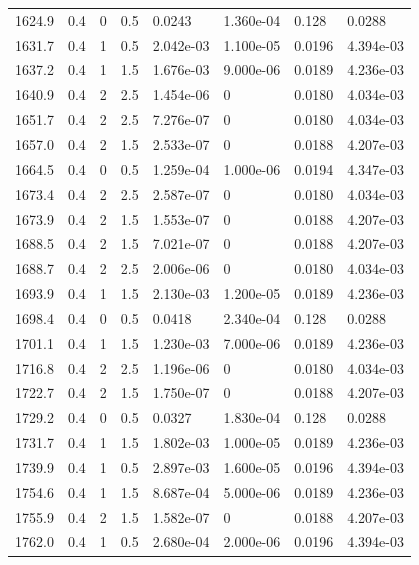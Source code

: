 \documentclass[preview]{standalone}
\begin{document}
{{{{{\begin{tabular}{L{1.2cm}C{1.2cm} C{0.3cm}C{0.5cm} C{1.4cm}C{1.4cm} C{1.4cm}C{1.4cm}}
  1624.9  &   0.4  & 0     & 0.5 &  0.0243  & 1.360e-04  & 0.128 &  0.0288   \\ 
  1631.7  &   0.4  & 1     & 0.5 &  2.042e-03  & 1.100e-05  & 0.0196 &  4.394e-03   \\ 
  1637.2  &   0.4  & 1     & 1.5 &  1.676e-03  & 9.000e-06  & 0.0189 &  4.236e-03   \\ 
  1640.9  &   0.4  & 2     & 2.5 &  1.454e-06  & 0  & 0.0180 &  4.034e-03   \\ 
  1651.7  &   0.4  & 2     & 2.5 &  7.276e-07  & 0  & 0.0180 &  4.034e-03   \\ 
  1657.0  &   0.4  & 2     & 1.5 &  2.533e-07  & 0  & 0.0188 &  4.207e-03   \\ 
  1664.5  &   0.4  & 0     & 0.5 &  1.259e-04  & 1.000e-06  & 0.0194 &  4.347e-03   \\ 
  1673.4  &   0.4  & 2     & 2.5 &  2.587e-07  & 0  & 0.0180 &  4.034e-03   \\ 
  1673.9  &   0.4  & 2     & 1.5 &  1.553e-07  & 0  & 0.0188 &  4.207e-03   \\ 
  1688.5  &   0.4  & 2     & 1.5 &  7.021e-07  & 0  & 0.0188 &  4.207e-03   \\ 
  1688.7  &   0.4  & 2     & 2.5 &  2.006e-06  & 0  & 0.0180 &  4.034e-03   \\ 
  1693.9  &   0.4  & 1     & 1.5 &  2.130e-03  & 1.200e-05  & 0.0189 &  4.236e-03   \\ 
  1698.4  &   0.4  & 0     & 0.5 &  0.0418  & 2.340e-04  & 0.128 &  0.0288   \\ 
  1701.1  &   0.4  & 1     & 1.5 &  1.230e-03  & 7.000e-06  & 0.0189 &  4.236e-03   \\ 
  1716.8  &   0.4  & 2     & 2.5 &  1.196e-06  & 0  & 0.0180 &  4.034e-03   \\ 
  1722.7  &   0.4  & 2     & 1.5 &  1.750e-07  & 0  & 0.0188 &  4.207e-03   \\ 
  1729.2  &   0.4  & 0     & 0.5 &  0.0327  & 1.830e-04  & 0.128 &  0.0288   \\ 
  1731.7  &   0.4  & 1     & 1.5 &  1.802e-03  & 1.000e-05  & 0.0189 &  4.236e-03   \\ 
  1739.9  &   0.4  & 1     & 0.5 &  2.897e-03  & 1.600e-05  & 0.0196 &  4.394e-03   \\ 
  1754.6  &   0.4  & 1     & 1.5 &  8.687e-04  & 5.000e-06  & 0.0189 &  4.236e-03   \\ 
  1755.9  &   0.4  & 2     & 1.5 &  1.582e-07  & 0  & 0.0188 &  4.207e-03   \\ 
  1762.0  &   0.4  & 1     & 0.5 &  2.680e-04  & 2.000e-06  & 0.0196 &  4.394e-03   \\ 

\end{tabular}}}}}}
\end{document}
